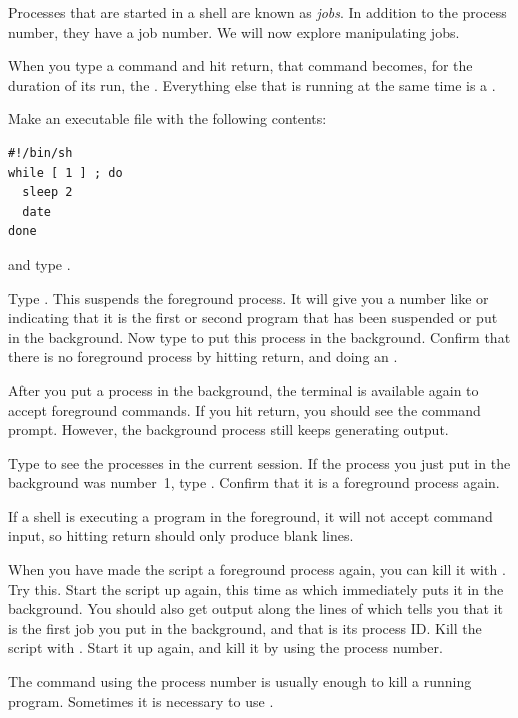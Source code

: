 Processes that are started in a shell are known as
\emph{jobs}.
In addition to the process number, they have a job number.
We will now explore manipulating jobs.

When you type a command and hit return, that command becomes, for
the duration of its run, the .
Everything else that is running at the same time is a
.

Make an executable file  with the following contents:
\begin{lstlisting}
#!/bin/sh
while [ 1 ] ; do
  sleep 2
  date
done
\end{lstlisting}
and type . 

\begin{exercise}
  Type . This suspends the foreground process. It will
  give you a number like \n{[1]} or \n{[2]} indicating that it is the
  first or second program that has been suspended or put in the
  background. Now type  to put this process in the
  background. Confirm that there is no foreground process by hitting
  return, and doing an .
\end{exercise}
\begin{outcome}
  After you put a process in the background, the terminal is available
  again to accept foreground commands. If you hit return, you should
  see the command prompt. However, the background process still keeps
  generating output.
\end{outcome}

\begin{exercise}
  Type  to see the processes in the current session. If the
  process you just put in the background was number~1,
  type . Confirm that it is a foreground process again.
\end{exercise}
\begin{outcome}
  If a shell is executing a program in the foreground, it will not
  accept command input, so hitting return should only produce blank
  lines.
\end{outcome}

\begin{exercise}
  When you have made the  script a foreground
    process again, you can kill it with . Try this. Start
    the script up again, this time as  which immediately
    puts it in the background. You should also get output along the
    lines of  which tells you that it is the first job you
    put in the background, and that  is its process ID. Kill
    the script with . Start it up again, and kill it by
    using the process number.
\end{exercise}
\begin{outcome}
  The command  using the process number is usually
  enough to kill a running program. Sometimes it is necessary to use
  .
\end{outcome}

